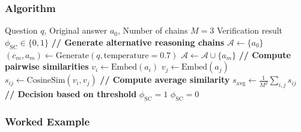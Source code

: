 \documentclass[12pt,a4paper]{article}
\theoremstyle{definition}
\begin{document}
\subsubsection{Algorithm}

\begin{algorithm}[htbp]
\caption{Self-Consistency Verification}
\begin{algorithmic}[1]
\Require Question $q$, Original answer $a_0$, Number of chains $M=3$
\Ensure Verification result $\phi_{\text{SC}} \in \{0, 1\}$
\State
\State \textbf{// Generate alternative reasoning chains}
\State $\mathcal{A} \gets \{a_0\}$ 
    \State $(c_m, a_m) \gets \text{Generate}(q, \text{temperature}=0.7)$ 
    \State $\mathcal{A} \gets \mathcal{A} \cup \{a_m\}$
\EndFor
\State
\State \textbf{// Compute pairwise similarities}
    \State $v_i \gets \text{Embed}(a_i)$ 
    \State $v_j \gets \text{Embed}(a_j)$
    \State $s_{ij} \gets \text{CosineSim}(v_i, v_j)$
\EndFor
\State
\State \textbf{// Compute average similarity}
\State $s_{\text{avg}} \gets \frac{1}{M^2} \sum_{i,j} s_{ij}$
\State
\State \textbf{// Decision based on threshold}
 
    \State \Return $\phi_{\text{SC}} = 1$ 
\Else
    \State \Return $\phi_{\text{SC}} = 0$ 
\EndIf
\end{algorithmic}
\end{algorithm}

\subsubsection{Worked Example}
\end{document}
